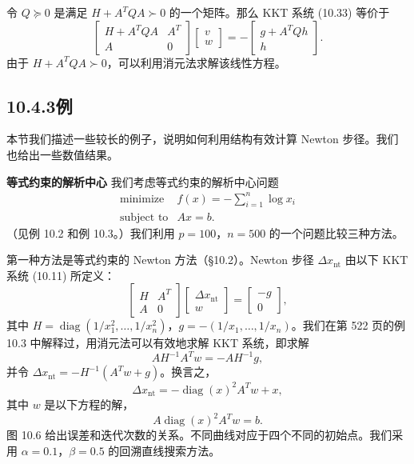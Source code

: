 \documentclass[UTF8, 12pt, fontset=fandol, oneside]{ctexart}
\begin{document}
令 $Q\succeq0$ 是满足 $H+A^TQA\succ0$ 的一个矩阵。那么 KKT 系统 (10.33) 等价于
\[
\begin{bmatrix}
H+A^TQA&A^T\\
A&0
\end{bmatrix}
\begin{bmatrix}
v\\
w
\end{bmatrix}
=-
\begin{bmatrix}
g+A^TQh\\
h
\end{bmatrix}.
\]
由于 $H+A^TQA\succ0$，可以利用消元法求解该线性方程。

\subsection*{10.4.3\quad 例}

本节我们描述一些较长的例子，说明如何利用结构有效计算 Newton 步径。我们也给出一些数值结果。

\noindent\textbf{等式约束的解析中心}\quad
我们考虑等式约束的解析中心问题
\[
\begin{array}{ll}
\mbox{minimize} & f(x)=-\displaystyle\sum_{i=1}^n\log x_i\\
\mbox{subject to} & Ax=b.
\end{array}
\]
（见例 10.2 和例 10.3。）我们利用 $p=100$，$n=500$ 的一个问题比较三种方法。

第一种方法是等式约束的 Newton 方法（\S10.2）。Newton 步径 $\Delta x_{\mathrm{nt}}$ 由以下 KKT 系统 (10.11) 所定义：
\[
\begin{bmatrix}
H&A^T\\
A&0
\end{bmatrix}
\begin{bmatrix}
\Delta x_{\mathrm{nt}}\\
w
\end{bmatrix}
=
\begin{bmatrix}
-g\\
0
\end{bmatrix},
\]
其中 $H=\operatorname{diag}(1/x_1^2,\ldots,1/x_n^2)$，$g=-(1/x_1,\ldots,1/x_n)$。我们在第 522 页的例 10.3 中解释过，用消元法可以有效地求解 KKT 系统，即求解
\[
AH^{-1}A^Tw=-AH^{-1}g,
\]
并令 $\Delta x_{\mathrm{nt}}=-H^{-1}(A^Tw+g)$。换言之，
\[
\Delta x_{\mathrm{nt}}=-\operatorname{diag}(x)^2A^Tw+x,
\]
其中 $w$ 是以下方程的解，
\begin{equation}
A\operatorname{diag}(x)^2A^Tw=b.
\tag{10.34}
\end{equation}
图 10.6 给出误差和迭代次数的关系。不同曲线对应于四个不同的初始点。我们采用 $\alpha=0.1$，$\beta=0.5$ 的回溯直线搜索方法。
\end{document}

